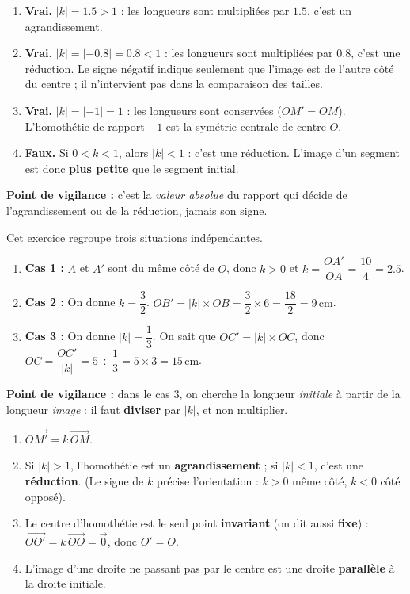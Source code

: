 \documentclass[11pt]{article}
\begin{document}
\begin{corrige}
\begin{enumerate}
\item \textbf{Vrai.} $|k| = \num{1,5} > 1$ : les longueurs sont multipliées par $\num{1,5}$, c'est un agrandissement.
\item \textbf{Vrai.} $|k| = |-\num{0,8}| = \num{0,8} < 1$ : les longueurs sont multipliées par $\num{0,8}$, c'est une réduction. Le signe négatif indique seulement que l'image est de l'autre côté du centre ; il n'intervient pas dans la comparaison des tailles.
\item \textbf{Vrai.} $|k| = |-1| = 1$ : les longueurs sont conservées ($OM' = OM$). L'homothétie de rapport $-1$ est la symétrie centrale de centre $O$.
\item \textbf{Faux.} Si $0 < k < 1$, alors $|k| < 1$ : c'est une réduction. L'image d'un segment est donc \textbf{plus petite} que le segment initial.
\end{enumerate}
\textbf{Point de vigilance :} c'est la \emph{valeur absolue} du rapport qui décide de l'agrandissement ou de la réduction, jamais son signe.
\end{corrige}

\begin{corrige}
Cet exercice regroupe trois situations indépendantes.
\begin{enumerate}
\item \textbf{Cas 1 :} $A$ et $A'$ sont du même côté de $O$, donc $k > 0$ et $k = \dfrac{OA'}{OA} = \dfrac{10}{4} = \num{2,5}$.
\item \textbf{Cas 2 :} On donne $k = \dfrac{3}{2}$. $OB' = |k| \times OB = \dfrac{3}{2} \times 6 = \dfrac{18}{2} = 9\,\text{cm}$.
\item \textbf{Cas 3 :} On donne $|k| = \dfrac{1}{3}$. On sait que $OC' = |k| \times OC$, donc $OC = \dfrac{OC'}{|k|} = 5 \div \dfrac{1}{3} = 5 \times 3 = 15\,\text{cm}$.
\end{enumerate}
\textbf{Point de vigilance :} dans le cas 3, on cherche la longueur \emph{initiale} à partir de la longueur \emph{image} : il faut \textbf{diviser} par $|k|$, et non multiplier.
\end{corrige}

\begin{corrige}
\begin{enumerate}
\item $\overrightarrow{OM'} = k\,\overrightarrow{OM}$.
\item Si $|k| > 1$, l'homothétie est un \textbf{agrandissement} ; si $|k| < 1$, c'est une \textbf{réduction}. (Le signe de $k$ précise l'orientation : $k>0$ même côté, $k<0$ côté opposé).
\item Le centre d'homothétie est le seul point \textbf{invariant} (on dit aussi \textbf{fixe}) : $\overrightarrow{OO'} = k\,\overrightarrow{OO} = \vec{0}$, donc $O' = O$.
\item L'image d'une droite ne passant pas par le centre est une droite \textbf{parallèle} à la droite initiale.
\end{enumerate}
\end{corrige}
\end{document}
